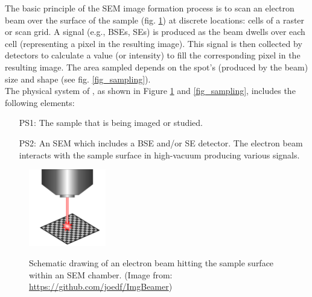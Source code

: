 \documentclass[12pt]{article}
\begin{document}
The basic principle of the SEM image formation process is to scan an electron beam over the surface 
of the sample (fig. \ref{fig_ebeam}) at discrete locations: cells of a raster or scan grid. A signal (e.g., BSEs, SEs) is 
produced as the beam dwells over each cell (representing a pixel in the resulting image). This 
signal is then collected by detectors to calculate a value (or intensity) to fill the corresponding
pixel in the resulting image. The area sampled depends on the spot's (produced by the beam) size and 
shape (see fig. \ref{fig_sampling}). \\

The physical system of \progname{}, as shown in Figure \ref{fig_ebeam} and \ref{fig_sampling},
includes the following elements:

\begin{itemize}

\item[PS1:] The sample that is being imaged or studied.

\item[PS2:] An SEM which includes a BSE and/or SE detector. The electron beam interacts with the sample surface in high-vacuum producing various signals.

\end{itemize}

\setlength{\belowcaptionskip}{-30pt}
\begin{figure}[h!]
\begin{center}
{
 \includegraphics[width=0.3\textwidth]{figures/e_beam.png}
}
\caption{\label{fig_ebeam} Schematic drawing of an electron beam hitting the sample surface within an SEM chamber. (Image from: \url{https://github.com/joedf/ImgBeamer})}
\end{center}
\end{figure}
\setlength{\belowcaptionskip}{10pt}
\end{document}
